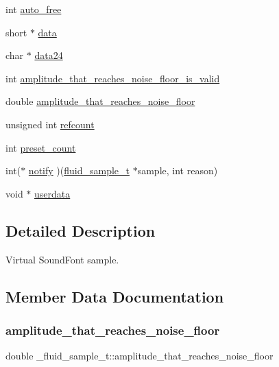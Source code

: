 \begin{DoxyCompactItemize}
\item 
int \hyperlink{struct__fluid__sample__t_a376e4ff95b5d7fd522c48417f15eb2a2}{auto\+\_\+free}
\item 
short $\ast$ \hyperlink{struct__fluid__sample__t_a8c7262f51500369fd1a3e5306b458d55}{data}
\item 
char $\ast$ \hyperlink{struct__fluid__sample__t_ad2153e233ec84d2ed36a310330eec820}{data24}
\item 
int \hyperlink{struct__fluid__sample__t_ac054e203acd07ad158256e343f1fd0a5}{amplitude\+\_\+that\+\_\+reaches\+\_\+noise\+\_\+floor\+\_\+is\+\_\+valid}
\item 
double \hyperlink{struct__fluid__sample__t_a91eee4970ca353df88665c0c3119e841}{amplitude\+\_\+that\+\_\+reaches\+\_\+noise\+\_\+floor}
\item 
unsigned int \hyperlink{struct__fluid__sample__t_a50767943f4a3110db0d4e724cdbe65ec}{refcount}
\item 
int \hyperlink{struct__fluid__sample__t_ae26113d0d8e350ad6016066ac027a70c}{preset\+\_\+count}
\item 
int($\ast$ \hyperlink{struct__fluid__sample__t_ad43c2d0777a885a54e1dd3462ded025e}{notify} )(\hyperlink{types_8h_abf9174d452679ca1a4ee7d693fb773cf}{fluid\+\_\+sample\+\_\+t} $\ast$sample, int reason)
\item 
void $\ast$ \hyperlink{struct__fluid__sample__t_a69e7d313f22e2fd35638d064012bda0a}{userdata}
\end{DoxyCompactItemize}


\subsection{Detailed Description}
Virtual Sound\+Font sample. 

\subsection{Member Data Documentation}
\mbox{\label{struct__fluid__sample__t_a91eee4970ca353df88665c0c3119e841}} 
\subsubsection{\texorpdfstring{amplitude\+\_\+that\+\_\+reaches\+\_\+noise\+\_\+floor}{amplitude\_that\_reaches\_noise\_floor}}
{\footnotesize\ttfamily double \+\_\+fluid\+\_\+sample\+\_\+t\+::amplitude\+\_\+that\+\_\+reaches\+\_\+noise\+\_\+floor}

